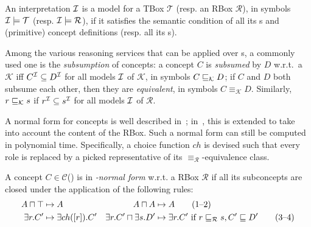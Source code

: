 An interpretation \(\mathcal{I}\) is a model for a TBox \(\mathcal{T}\) (resp. an RBox \(\mathcal{R}\)), in symbols \(\mathcal{I} \models \mathcal{T}\) (resp. \(\mathcal{I} \models \mathcal{R}\)), if it satisfies the semantic condition of all its \gci{}s and (primitive) concept definitions (resp. all its \ria{}s).

Among the various reasoning services that can be applied over \elh \kb{}s, a commonly used one is the \emph{subsumption} of concepts: a concept \(C\) is \emph{subsumed} by \(D\) w.r.t.\ a \kb \(\mathcal{K}\) iff \(C^{\mathcal{I}} \subseteq D^{\mathcal{I}}\) for all models \(\mathcal{I}\) of \(\mathcal{K}\), in symbols \(C \sqsubseteq_{\mathcal{K}} D\); if \(C\) and \(D\) both subsume each other, then they are \emph{equivalent}, in symbols \(C \equiv_{\mathcal{K}} D\).
Similarly, \(r \sqsubseteq_{\mathcal{K}} s\) if \(r^{\mathcal{I}} \subseteq s^{\mathcal{I}}\) for all models \(\mathcal{I}\) of \(\mathcal{R}\).

A normal form for \el concepts is well described in~\cite{DLbook}; in~\cite{LeTu12}, this is extended to take into account the content of the RBox.
Such a normal form can still be computed in polynomial time.
Specifically, a choice function \(ch{}\) is devised such that every role is replaced by a picked representative of its \(\equiv_\mathcal{R}\)-equivalence class.
\begin{definition}
  A concept \(C \in \mathcal{C}\)(\elh) is in \emph{\elh-normal form} w.r.t. a RBox \(\mathcal{R}\) if all its subconcepts are closed under the application of the following rules:
  \begin{align*}
    A \sqcap \top &\mapsto A & A \sqcap A &\mapsto A \tag{1--2}\\
    \exists{}r.C^\prime &\mapsto \exists{}ch([r]).C^\prime &
    \exists{}r.C^\prime \sqcap \exists{}s.D^\prime &\mapsto
    \exists{}r.C^\prime\,\,\text{if}\,\,r\sqsubseteq_{\mathcal{R}}s, C^\prime \sqsubseteq D^\prime \tag{3--4}
  \end{align*}
\end{definition}